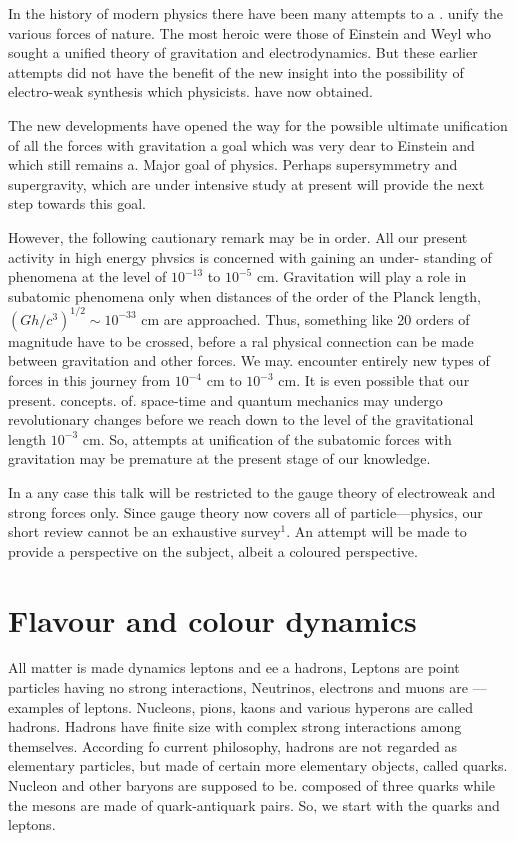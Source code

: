 In the history of modern physics there have been many attempts to a .
unify the various forces of nature. The most heroic were those of Einstein
and Weyl who sought a unified theory of gravitation and electrodynamics.
But these earlier attempts did not have the benefit of the new insight into
the possibility of electro-weak synthesis which physicists. have now
obtained. 

The new developments have opened the way for the powsible ultimate unification of all the forces with gravitation a goal which was very dear to Einstein and which still remains a. Major goal of physics. Perhaps supersymmetry and supergravity, which are under intensive study at present will provide the next step towards this goal.

However, the following cautionary remark may be in order. All our present activity in high energy phvsics is concerned with gaining an under- standing of phenomena at the level of $10^{-13}$ to $10^{-5}$ cm. Gravitation will play a role in subatomic phenomena only when distances of the order of the Planck length, $(Gh/c^{3})^{1/2} \sim 10^{-33}$ cm are approached. Thus, something like 20 orders of magnitude have to be crossed, before a ral physical connection can be made between gravitation and other forces. We may. encounter entirely new types of forces in this journey from $10^{-4}$ cm to $10^{-3}$ cm. It is even possible that our present. concepts. of. space-time and quantum mechanics may undergo revolutionary changes before we reach down to the level of the gravitational length $10^{-3}$ cm. So, attempts at unification of the subatomic forces with gravitation may be premature at the
present stage of our knowledge. 

In a any case this talk will be restricted to the gauge theory of electroweak and strong forces only. Since gauge theory now covers all of particle—physics, our short review cannot be an exhaustive survey$^{1}$. An attempt will be made to provide a perspective on the subject, albeit a coloured perspective. 

\section{Flavour and colour dynamics} 


All matter is made dynamics leptons and ee a hadrons, Leptons are point particles having no strong interactions, Neutrinos, electrons and muons are — examples of leptons. Nucleons, pions, kaons and various hyperons are called hadrons. Hadrons have finite size with complex strong interactions among themselves. According fo current philosophy, hadrons are not regarded as elementary particles, but made of certain more elementary objects, called quarks. Nucleon and other baryons are supposed to be. composed of three quarks while the mesons are made of quark-antiquark pairs. So, we start with the quarks and leptons. 

